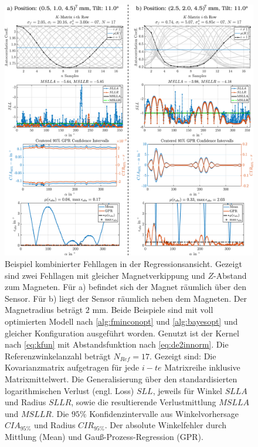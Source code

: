 \clearpage
\begin{figure}[tbph]
	\centering
	\includegraphics[width=\linewidth]{chapters/images/4-EuOExp/Kombinierte-Fehllagen-GPR}
	\caption[Beispiel kombinierter Fehllagen in der Regressionsansicht]{Beispiel kombinierter Fehllagen in der Regressionsansicht. Gezeigt sind zwei Fehllagen mit gleicher Magnetverkippung und $Z$-Abstand zum Magneten. Für a) befindet sich der Magnet räumlich über den Sensor. Für b) liegt der Sensor räumlich neben dem Magneten. Der Magnetradius beträgt $2$ mm. Beide Beispiele sind mit voll optimierten Modell nach \autoref{alg:fminconopt} und \autoref{alg:bayesopt} und gleicher Konfiguration ausgeführt worden. Genutzt ist der Kernel nach \autoref{eq:kfun} mit Abstandsfunktion nach \autoref{eq:de2innorm}. Die Referenzwinkelanzahl beträgt $N_{Ref} = 17$. Gezeigt sind: Die Kovarianzmatrix aufgetragen für jede $i-te$ Matrixreihe inklusive Matrixmittelwert. Die Generalisierung über den standardisierten logarithmischen Verlust (engl. Loss) $SLL$, jeweils für Winkel $SLLA$ und Radius $SLLR$, sowie die resultierende Verlustmittlung $MSLLA$ und $MSLLR$. Die $95\%$ Konfidenzintervalle aus Winkelvorhersage $CIA_{95\%}$ und Radius $CIR_{95\%}$. Der absolute Winkelfehler durch Mittlung (Mean) und Gauß-Prozess-Regression (GPR).}
	\label{fig:kombinierte-fehllagen-gpr}
\end{figure}


